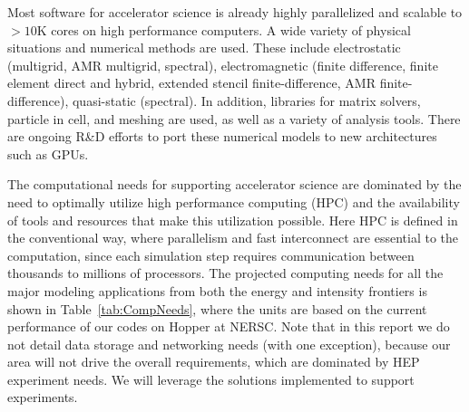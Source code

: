 Most software for accelerator science is already  highly parallelized and scalable to $> 10$K cores on high performance computers. A wide variety of physical situations and numerical methods are used. These include  electrostatic (multigrid, AMR multigrid, spectral), electromagnetic (finite difference, finite element direct and hybrid, extended stencil finite-difference, AMR finite-difference), quasi-static (spectral).  In addition,  libraries for matrix solvers, particle in cell, and meshing are used, as well as a variety of analysis tools. There are ongoing R\&D efforts to port these numerical models to new architectures such as GPUs.

The computational needs for supporting accelerator
science are dominated by the need to optimally utilize
high performance computing (HPC) and the availability of tools
and resources that make this utilization possible.  Here HPC is
defined in the conventional way, where parallelism and fast
interconnect are essential to the computation, since each
simulation step requires communication between thousands to
millions of processors. The projected computing  needs for all
the major modeling applications from both the energy and intensity
frontiers is shown in Table~\ref{tab:CompNeeds}, where the units
are based on the current performance of our codes on Hopper at
NERSC. Note that in this report we do not detail data storage and
networking needs (with one exception), because our area will not
drive the overall requirements, which are dominated by HEP
experiment needs.  We will leverage the solutions
implemented to support experiments.

